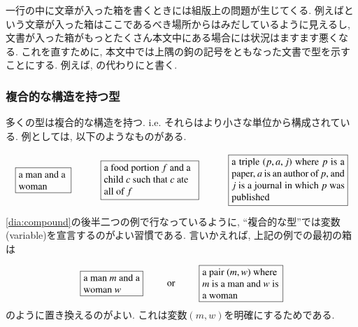 
一行の中に文章が入った箱を書くときには組版上の問題が生じてくる. 例えばという文章が入った箱はここであるべき場所からはみだしているように見えるし, 文書が入った箱がもっとたくさん本文中にある場合には状況はますます悪くなる. これを直すために, 本文中では上隅の鉤の記号をともなった文書で型を示すことにする. 例えば, の代わりにと書く.


\subsubsection{複合的な構造を持つ型}


多くの型は複合的な構造を持つ. i.e. それらはより小さな単位から構成されている. 例としては, 以下のようなものがある. \begin{align}\label{dia:compound}\xymatrixnocompile{\obox{}{.7in}{\rr a man and a woman}&\obox{}{1.3in}{\rr a food portion $f$ and a child $c$ such that $c$ ate all of $f$}&\labox{}{a triple $(p,a,j)$ where $p$ is a paper, $a$ is an author of $p$, and $j$ is a journal in which $p$ was published}}\end{align} \eqref{dia:compound}の後半二つの例で行なっているように, ``複合的な型''では変数(variable)を宣言するのがよい習慣である. 言いかえれば, 上記の例での最初の箱は$$\obox{}{.8in}{a man $m$ and a woman $w$}\hsp\tn{or}\hsp\obox{}{1.1in}{\rr a pair $(m,w)$ where $m$ is a man and $w$ is a woman}$$のように置き換えるのがよい. これは変数$(m,w)$を明確にするためである.

